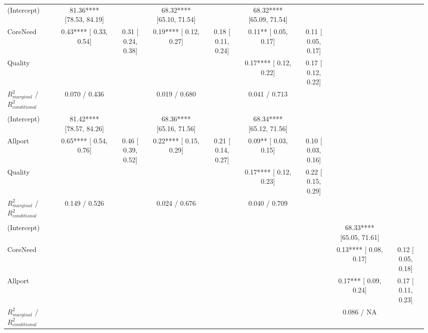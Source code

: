 \begin{landscape}
\begin{table}
\begin{minipage}[t][\textheight][t]{\textwidth}
{\begin{tabular}[t]{lcccccccc}
\hspace{1em}(Intercept) & 81.36**** [78.53, 84.19] &  & 68.32**** [65.10, 71.54] &  & 68.32**** [65.09, 71.54] &  &  & \\
\hspace{1em}CoreNeed & 0.43**** [ 0.33,  0.54] & 0.31 [ 0.24, 0.38] & 0.19**** [ 0.12,  0.27] & 0.18 [ 0.11, 0.24] & 0.11** [ 0.05,  0.17] & 0.11 [ 0.05,  0.17] &  & \\
\hspace{1em}Quality &  &  &  &  & 0.17**** [ 0.12,  0.22] & 0.17 [ 0.12,  0.22] &  & \\
\hspace{1em}$R^2_{marginal}$ / $R^2_{conditional}$ & 0.070 / 0.436 &  & 0.019 / 0.680 &  & 0.041 / 0.713 &  &  & \\
\addlinespace[0.3em]
\multicolumn{9}{l}{\textbf{Study 3: Allport}}\\
\hspace{1em}(Intercept) & 81.42**** [78.57, 84.26] &  & 68.36**** [65.16, 71.56] &  & 68.34**** [65.12, 71.56] &  &  & \\
\hspace{1em}Allport & 0.65**** [ 0.54,  0.76] & 0.46 [ 0.39, 0.52] & 0.22**** [ 0.15,  0.29] & 0.21 [ 0.14, 0.27] & 0.09** [ 0.03,  0.15] & 0.10 [ 0.03, 0.16] &  & \\
\hspace{1em}Quality &  &  &  &  & 0.17**** [ 0.12,  0.23] & 0.22 [ 0.15, 0.29] &  & \\
\hspace{1em}$R^2_{marginal}$ / $R^2_{conditional}$ & 0.149 / 0.526 &  & 0.024 / 0.676 &  & 0.040 / 0.709 &  &  & \\
\addlinespace[0.3em]
\multicolumn{9}{l}{\textbf{Study 3: Needs \& Allport}}\\
\hspace{1em}(Intercept) &  &  &  &  &  &  & 68.33**** [65.05, 71.61] & \\
\hspace{1em}CoreNeed &  &  &  &  &  &  & 0.13**** [ 0.08,  0.17] & 0.12 [ 0.05, 0.18]\\
\hspace{1em}Allport &  &  &  &  &  &  & 0.17*** [ 0.09,  0.24] & 0.17 [ 0.11, 0.23]\\
\hspace{1em}$R^2_{marginal}$ / $R^2_{conditional}$ &  &  &  &  &  &  & 0.086 / NA & \\
\bottomrule
\end{tabular}}
\end{minipage}
\end{table}
\end{landscape}
